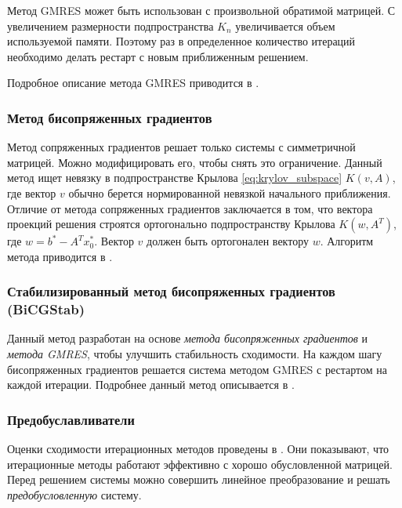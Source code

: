 Метод GMRES может быть использован с произвольной обратимой матрицей. С увеличением размерности подпространства $K_n$ увеличивается объем используемой памяти. Поэтому раз в определенное количество итераций необходимо делать рестарт с новым приближенным решением.
\par
Подробное описание метода GMRES приводится в \cite{saad2003iterative}.

\subsubsection{Метод бисопряженных градиентов}
Метод сопряженных градиентов решает только системы с симметричной матрицей. Можно модифицировать его, чтобы снять это ограничение.
Данный метод ищет невязку в подпространстве Крылова \eqref{eq:krylov_subspace} $K(v, A)$, где вектор $v$ обычно берется нормированной невязкой начального приближения. Отличие от метода сопряженных градиентов заключается в том, что вектора проекций решения строятся ортогонально подпространству Крылова $K(w, A^T)$, где $w = b^* - A^T x_0^*$. Вектор $v$ должен быть ортогонален вектору $w$. Алгоритм метода приводится в \cite{saad2003iterative}.  

\subsubsection{Стабилизированный метод бисопряженных градиентов (BiCGStab) \label{methods:bicgstab}}
Данный метод разработан на основе \textit{метода бисопряженных градиентов} и \textit{метода GMRES}, чтобы улучшить стабильность сходимости. На каждом шагу бисопряженных градиентов решается система методом GMRES с рестартом на каждой итерации.
Подробнее данный метод описывается в \cite{saad2003iterative}.

\subsubsection{Предобуславливатели \label{methods:preconditioning}}
Оценки сходимости итерационных методов проведены в \cite{briggs2000multigrid}. Они показывают, что итерационные методы работают эффективно с хорошо обусловленной матрицей. Перед решением системы можно совершить линейное преобразование и решать \textit{предобусловленную} систему. 
